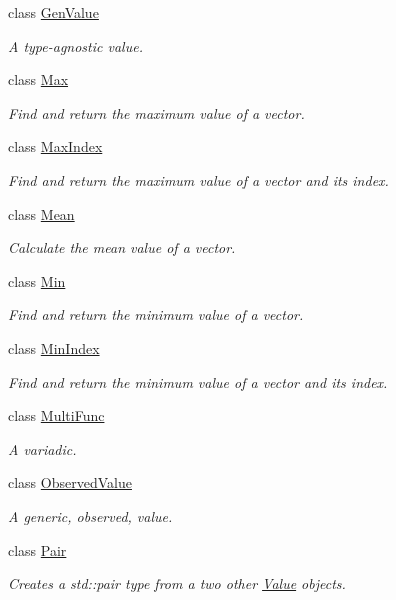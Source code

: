 \begin{DoxyCompactItemize}
class \hyperlink{classfilval_1_1GenValue}{Gen\+Value}
\begin{DoxyCompactList}\small\item\em A type-\/agnostic value. \end{DoxyCompactList}\item 
class \hyperlink{classfilval_1_1Max}{Max}
\begin{DoxyCompactList}\small\item\em Find and return the maximum value of a vector. \end{DoxyCompactList}\item 
class \hyperlink{classfilval_1_1MaxIndex}{Max\+Index}
\begin{DoxyCompactList}\small\item\em Find and return the maximum value of a vector and its index. \end{DoxyCompactList}\item 
class \hyperlink{classfilval_1_1Mean}{Mean}
\begin{DoxyCompactList}\small\item\em Calculate the mean value of a vector. \end{DoxyCompactList}\item 
class \hyperlink{classfilval_1_1Min}{Min}
\begin{DoxyCompactList}\small\item\em Find and return the minimum value of a vector. \end{DoxyCompactList}\item 
class \hyperlink{classfilval_1_1MinIndex}{Min\+Index}
\begin{DoxyCompactList}\small\item\em Find and return the minimum value of a vector and its index. \end{DoxyCompactList}\item 
class \hyperlink{classfilval_1_1MultiFunc}{Multi\+Func}
\begin{DoxyCompactList}\small\item\em A variadic. \end{DoxyCompactList}\item 
class \hyperlink{classfilval_1_1ObservedValue}{Observed\+Value}
\begin{DoxyCompactList}\small\item\em A generic, observed, value. \end{DoxyCompactList}\item 
class \hyperlink{classfilval_1_1Pair}{Pair}
\begin{DoxyCompactList}\small\item\em Creates a std\+::pair type from a two other \hyperlink{classfilval_1_1Value}{Value} objects. \end{DoxyCompactList}\item 

\end{DoxyCompactItemize}
